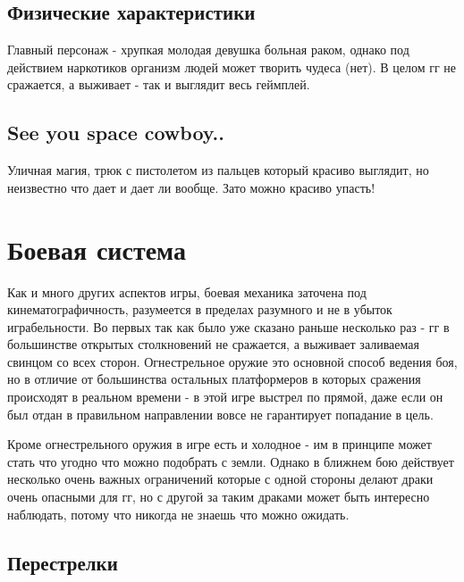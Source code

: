 \documentclass[11pt]{report}
\begin{document}
\subsection{Физические характеристики}
Главный персонаж - хрупкая молодая девушка больная раком, однако под действием наркотиков организм людей может творить чудеса (нет). В целом гг не сражается, а выживает - так и выглядит весь геймплей.\\

\subsection{See you space cowboy..}
Уличная магия, трюк с пистолетом из пальцев который красиво выглядит, но неизвестно что дает и дает ли вообще. Зато можно красиво упасть!\\

\newpage
\section{Боевая система}
Как и много других аспектов игры, боевая механика заточена под кинематографичность, разумеется в пределах разумного и не в убыток играбельности. Во первых так как было уже сказано раньше несколько раз - гг в большинстве открытых столкновений не сражается, а выживает заливаемая свинцом со всех сторон. Огнестрельное оружие это основной способ ведения боя, но в отличие от большинства остальных платформеров в которых сражения происходят в реальном времени - в этой игре выстрел по прямой, даже если он был отдан в правильном направлении вовсе не гарантирует попадание в цель. 

Кроме огнестрельного оружия в игре есть и холодное - им в принципе может стать что угодно что можно подобрать с земли. Однако в ближнем бою действует несколько очень важных ограничений которые с одной стороны делают драки очень опасными для гг, но с другой за таким драками может быть интересно наблюдать, потому что никогда не знаешь что можно ожидать.\\

\subsection{Перестрелки}
\end{document}
